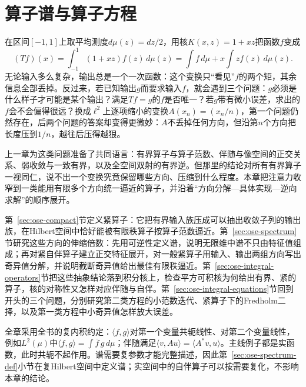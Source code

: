 \chapter{算子谱与算子方程}
\label{chap:operator-spectra-equations}

在区间$[-1,1]$上取平均测度$d\mu(z)=dz/2$，用核$K(x,z)=1+xz$把函数$f$变成
\[
  (Tf)(x)=\int_{-1}^{1}(1+xz)f(z)\,d\mu(z)=\int f\,d\mu+x\int zf(z)\,d\mu(z).
\]
无论输入多么复杂，输出总是一个一次函数：这个变换只“看见”$f$的两个矩，其余信息全部丢掉。反过来，若已知输出$g$而要求输入$f$，就会遇到三个问题：$g$必须是什么样子才可能是某个输出？满足$Tf=g$的$f$是否唯一？若$g$带有微小误差，求出的$f$会不会偏得很远？换成$\ell^2$上逐项缩小的变换$A(x_n)=(x_n/n)$，第一个问题仍然存在，后两个问题的答案却变得更微妙：$A$不丢掉任何方向，但沿第$n$个方向把长度压到$1/n$，越往后压得越狠。

上一章为这类问题准备了共同语言：有界算子与算子范数、伴随与像空间的正交关系、弱收敛与一致有界，以及全空间双射的有界逆。但那里的结论对所有有界算子一视同仁，说不出一个变换究竟保留哪些方向、压缩到什么程度。本章把注意力收窄到一类能用有限多个方向统一逼近的算子，并沿着“方向分解—具体实现—逆向求解”的顺序展开。

第~\ref{sec:ose-compact}节定义紧算子：它把有界输入族压成可以抽出收敛子列的输出族，在Hilbert空间中恰好能被有限秩算子按算子范数逼近。第~\ref{sec:ose-spectrum}节研究这些方向的伸缩倍数：先用可逆性定义谱，说明无限维中谱不只由特征值组成；再对紧自伴算子建立正交特征展开，对一般紧算子用输入、输出两组方向写出奇异值分解，并说明截断奇异值给出最佳有限秩逼近。第~\ref{sec:ose-integral-operators}节把这些抽象结论落到积分核上，检查平方可积核为何给出有界、紧的算子，核的对称性又怎样对应伴随与自伴。第~\ref{sec:ose-integral-equations}节回到开头的三个问题，分别研究第二类方程的小范数迭代、紧算子下的Fredholm二择，以及第一类方程中小奇异值怎样放大误差。

全章采用全书的复内积约定：$\langle f,g\rangle$对第一个变量共轭线性、对第二个变量线性，例如$L^2(\mu)$中$\langle f,g\rangle=\int\overline{f}\,g\,d\mu$；伴随满足$\langle v,Au\rangle=\langle A^*v,u\rangle$。主线例子都是实函数，此时共轭不起作用。谱需要复参数才能完整描述，因此第~\ref{sec:ose-spectrum-def}小节在复Hilbert空间中定义谱；实空间中的自伴算子可以按需要复化，不影响本章的结论。







